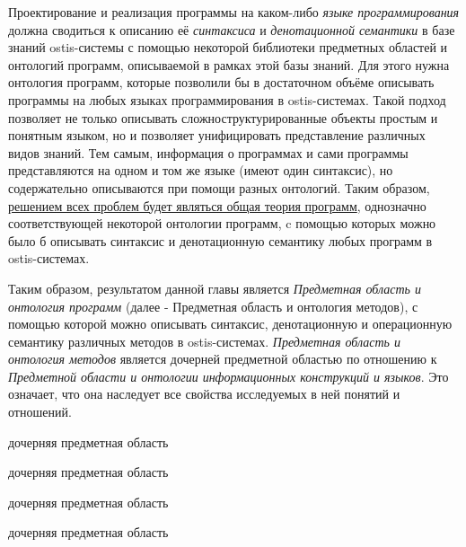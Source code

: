 Проектирование и реализация программы на каком-либо \textit{языке программирования} должна сводиться к описанию её \textit{синтаксиса} и \textit{денотационной семантики} в базе знаний ostis-системы с помощью некоторой библиотеки предметных областей и онтологий программ, описываемой в рамках этой базы знаний. Для этого нужна онтология программ, которые позволили бы в достаточном объёме описывать программы на любых языках программирования в ostis-системах. Такой подход позволяет не только описывать сложноструктурированные объекты простым и понятным языком, но и позволяет унифицировать представление различных видов знаний. Тем самым, информация о программах и сами программы представляются на одном и том же языке (имеют один синтаксис), но содержательно описываются при помощи разных онтологий. Таким образом, \uline{решением всех проблем будет являться общая теория программ}, однозначно соответствующей некоторой онтологии программ, c помощью которых можно было б описывать синтаксис и денотационную семантику любых программ в ostis-системах.

Таким образом, результатом данной главы является \textit{Предметная область и онтология программ} (далее - Предметная область и онтология методов), с помощью которой можно описывать синтаксис, денотационную и операционную семантику различных методов в ostis-системах. \textit{Предметная область и онтология методов} является дочерней предметной областью по отношению к \textit{Предметной области и онтологии информационных конструкций и языков}. Это означает, что она наследует все свойства исследуемых в ней понятий и отношений.

\begin{SCn}
\begin{scnrelfromlist}{дочерняя предметная область}
    \begin{scnindent}
        \begin{scnrelfromlist}{дочерняя предметная область}
        \end{scnrelfromlist}
    \end{scnindent}
\end{scnrelfromlist}
\end{SCn}

\begin{SCn}
\begin{scnrelfromlist}{дочерняя предметная область}
    \begin{scnindent}
        \begin{scnrelfromlist}{дочерняя предметная область}
        \end{scnrelfromlist}
    \end{scnindent}
\end{scnrelfromlist}
\end{SCn}

